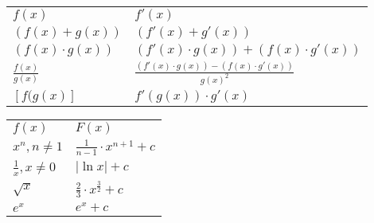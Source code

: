 \documentclass[10pt,a4paper,landscape]{article}
\begin{document}
\begin{multicols*}{4}
\noindent{}
\def\arraystretch{1.5}%
\begin{tabularx}{\columnwidth}{|l|X|}
\cline{1-2}
$f(x)$&$f'(x)$\\
\cline{1-2}
$(f(x)+g(x))$&$(f'(x)+g'(x))$\\ 
\cline{1-2}
$(f(x) \cdot g(x))$&$(f'(x) \cdot g(x)) + (f(x) \cdot g'(x))$\\
\cline{1-2}
$\frac{f(x)}{g(x)}$&$\frac{(f'(x) \cdot g(x)) - (f(x) \cdot g'(x))}{g(x)^2}$\\
\cline{1-2}
$[f(g(x)]$&$f'(g(x)) \cdot g'(x)$\\
\cline{1-2}
\end{tabularx}

\noindent{}
\def\arraystretch{1.5}%
\begin{tabularx}{\columnwidth}{|X|X|}
\cline{1-2}
$f(x)$&$F(x)$\\
\cline{1-2}
$x^n, n \neq 1$&$\frac{1}{n-1} \cdot x^{n+1} + c$\\ 
\cline{1-2}
$\frac{1}{x}, x \neq 0$&$\vert \ln x \vert + c$\\
\cline{1-2}
$\sqrt{x}$&$\frac{2}{3} \cdot x^{\frac{3}{2}} + c$\\
\cline{1-2}
$e^x$&$e^x + c$\\
\cline{1-2}
\end{tabularx}

\end{multicols*}
\end{document}
